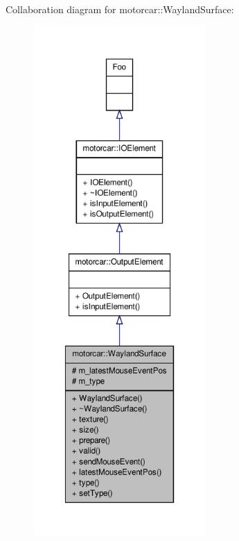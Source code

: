 Collaboration diagram for motorcar\-:\-:Wayland\-Surface\-:
\nopagebreak
\begin{figure}[H]
\begin{center}
\leavevmode
\includegraphics[height=550pt]{classmotorcar_1_1WaylandSurface__coll__graph}
\end{center}
\end{figure}
